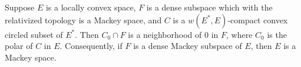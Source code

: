 Suppose $E$ is a locally convex space, $F$ is a dense subspace which with the relativized topology is a Mackey space, and $C$ is a $w(E^*,E)$-compact convex circled subset of $E^*$. Then $C_0 \cap F$ is a neighborhood of $0$ in $F$, where $C_0$ is the polar of $C$ in $E$. Consequently, if $F$ is a dense Mackey subspace of $E$, then $E$ is a Mackey space.
